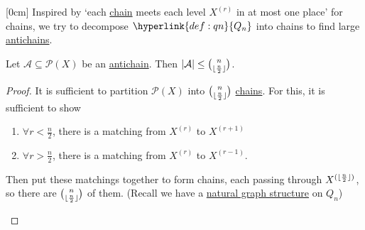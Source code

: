 \documentclass{article}
\DeclarePairedDelimiter\floor{\lfloor}{\rfloor}
\begin{document}
[0cm]
Inspired by `each \hyperlink{def:chain}{chain} meets each level $X^{(r)}$ in at most one place' for chains, we try to decompose $\hyperlink{def:qn}{Q_n}$ into chains to find large \hyperlink{def:antichain}{antichains}.
\begin{nthm}\label{thm:sperner1}
  Let $\mathcal{A} \subseteq \mathcal{P}(X)$ be an \hyperlink{def:antichain}{antichain}.
  Then $|\mathcal{A}| \leq \binom{n}{\floor{\frac{n}{2}}}$.
\end{nthm}
\begin{proof}
  It is sufficient to partition $\mathcal{P}(X)$ into $\binom{n}{\floor{\frac{n}{2}}}$ \hyperlink{def:chain}{chains}.
  For this, it is sufficient to show
  \begin{enumerate}[label=(\roman*)]
    \item $\forall r < \frac{n}{2}$, there is a matching from \hyperlink{def:superr}{$X^{(r)}$} to $X^{(r+1)}$
    \item $\forall r > \frac{n}{2}$, there is a matching from $X^{(r)}$ to $X^{(r-1)}$.
  \end{enumerate}
  Then put these matchings together to form chains, each passing through $X^{(\floor{\frac{n}{2}})}$, so there are $\binom{n}{\floor{\frac{n}{2}}}$ of them. (Recall we have a \hyperlink{def:ints}{natural graph structure} on \hyperlink{def:qn}{$Q_n$})

  \begin{center}
\end{center}
\end{proof}
\end{document}

